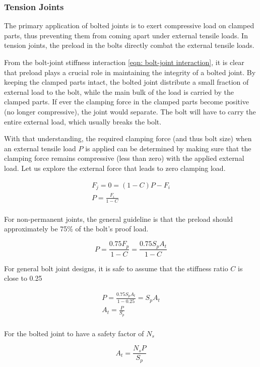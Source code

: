 \documentclass[a4paper,openany,nobib]{tufte-book}
\begin{document}
{{\subsubsection{Tension Joints}
\label{tension-joints}
The primary application of bolted joints is to exert compressive load on
clamped parts, thus preventing them from coming apart under external
tensile loads. In tension joints, the preload in the bolts directly
combat the external tensile loads.

From the bolt-joint stiffness interaction
\ref{eqn: bolt-joint interaction}, it is
clear that preload plays a crucial role in maintaining the integrity of
a bolted joint. By keeping the clamped parts intact, the bolted joint
distribute a small fraction of external load to the bolt, while the main
bulk of the load is carried by the clamped parts. If ever the clamping
force in the clamped parts become positive (no longer compressive), the
joint would separate. The bolt will have to carry the entire external
load, which usually breaks the bolt.

With that understanding, the required clamping force (and thus bolt
size) when an external tensile load \(P\) is applied can be determined by
making sure that the clamping force remains compressive (less than zero)
with the applied external load. Let us explore the external force that
leads to zero clamping load.

$$\begin{gathered}
  F_j = 0 = (1 - C)P - F_i \\ 
  P = \frac{F_i}{1 - C} \\ 
\end{gathered}$$

For non-permanent joints, the general guideline is that the preload
should approximately be 75\% of the bolt's proof load.

$$P = \frac{0.75F_p}{1 - C} = \frac{0.75S_pA_t}{1 - C}$$

For general bolt joint designs, it is safe to assume that the stiffness
ratio \(C\) is close to 0.25

$$\begin{gathered}
  P = \frac{0.75S_pA_t}{1 - 0.25} = S_pA_t \\ 
  A_t = \frac{P}{S_p} \\ 
\end{gathered}$$

For the bolted joint to have a safety factor of \(N_s\)

$$\label{eqn: tension joint bolt sizing}
  A_t = \frac{N_sP}{S_p}$$

}}
\end{document}
